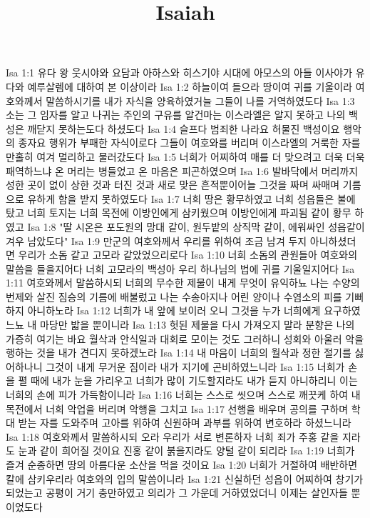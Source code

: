 

\title{Isaiah}

Isa 1:1  유다 왕 웃시야와 요담과 아하스와 히스기야 시대에 아모스의 아들 이사야가 유다와 예루살렘에 대하여 본 이상이라
Isa 1:2  하늘이여 들으라 땅이여 귀를 기울이라 여호와께서 말씀하시기를 내가 자식을 양육하였거늘 그들이 나를 거역하였도다
Isa 1:3  소는 그 임자를 알고 나귀는 주인의 구유를 알건마는 이스라엘은 알지 못하고 나의 백성은 깨닫지 못하는도다 하셨도다
Isa 1:4  슬프다 범죄한 나라요 허물진 백성이요 행악의 종자요 행위가 부패한 자식이로다 그들이 여호와를 버리며 이스라엘의 거룩한 자를 만홀히 여겨 멀리하고 물러갔도다
Isa 1:5  너희가 어찌하여 매를 더 맞으려고 더욱 더욱 패역하느냐 온 머리는 병들었고 온 마음은 피곤하였으며
Isa 1:6  발바닥에서 머리까지 성한 곳이 없이 상한 것과 터진 것과 새로 맞은 흔적뿐이어늘 그것을 짜며 싸매며 기름으로 유하게 함을 받지 못하였도다
Isa 1:7  너희 땅은 황무하였고 너희 성읍들은 불에 탔고 너희 토지는 너희 목전에 이방인에게 삼키웠으며 이방인에게 파괴됨 같이 황무 하였고
Isa 1:8  "딸 시온은 포도원의 망대 같이, 원두밭의 상직막 같이, 에워싸인 성읍같이 겨우 남았도다"
Isa 1:9  만군의 여호와께서 우리를 위하여 조금 남겨 두지 아니하셨더면 우리가 소돔 같고 고모라 같았었으리로다
Isa 1:10  너희 소돔의 관원들아 여호와의 말씀을 들을지어다 너희 고모라의 백성아 우리 하나님의 법에 귀를 기울일지어다
Isa 1:11  여호와께서 말씀하시되 너희의 무수한 제물이 내게 무엇이 유익하뇨 나는 수양의 번제와 살진 짐승의 기름에 배불렀고 나는 수송아지나 어린 양이나 수염소의 피를 기뻐하지 아니하노라
Isa 1:12  너희가 내 앞에 보이러 오니 그것을 누가 너희에게 요구하였느뇨 내 마당만 밟을 뿐이니라
Isa 1:13  헛된 제물을 다시 가져오지 말라 분향은 나의 가증히 여기는 바요 월삭과 안식일과 대회로 모이는 것도 그러하니 성회와 아울러 악을 행하는 것을 내가 견디지 못하겠노라
Isa 1:14  내 마음이 너희의 월삭과 정한 절기를 싫어하나니 그것이 내게 무거운 짐이라 내가 지기에 곤비하였느니라
Isa 1:15  너희가 손을 펼 때에 내가 눈을 가리우고 너희가 많이 기도할지라도 내가 듣지 아니하리니 이는 너희의 손에 피가 가득함이니라
Isa 1:16  너희는 스스로 씻으며 스스로 깨끗케 하여 내 목전에서 너희 악업을 버리며 악행을 그치고
Isa 1:17  선행을 배우며 공의를 구하며 학대 받는 자를 도와주며 고아를 위하여 신원하며 과부를 위하여 변호하라 하셨느니라
Isa 1:18  여호와께서 말씀하시되 오라 우리가 서로 변론하자 너희 죄가 주홍 같을 지라도 눈과 같이 희어질 것이요 진홍 같이 붉을지라도 양털 같이 되리라
Isa 1:19  너희가 즐겨 순종하면 땅의 아름다운 소산을 먹을 것이요
Isa 1:20  너희가 거절하여 배반하면 칼에 삼키우리라 여호와의 입의 말씀이니라
Isa 1:21  신실하던 성읍이 어찌하여 창기가 되었는고 공평이 거기 충만하였고 의리가 그 가운데 거하였었더니 이제는 살인자들 뿐이었도다
